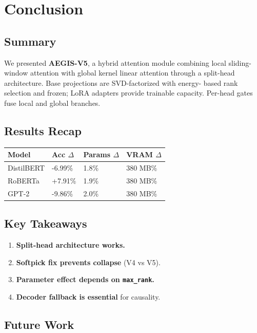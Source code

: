 \section{Conclusion}

\subsection{Summary}

We presented \textbf{AEGIS-V5}, a hybrid attention module combining local 
sliding-window attention with global kernel linear attention through a 
split-head architecture. Base projections are SVD-factorized with energy-
based rank selection and frozen; LoRA adapters provide trainable capacity. 
Per-head gates fuse local and global branches.

\subsection{Results Recap}

\begin{table}[H]
\centering
\small
\begin{tabular}{llll}
\toprule
\textbf{Model} & \textbf{Acc $\Delta$} & \textbf{Params $\Delta$} & \textbf{VRAM $\Delta$} \\
\midrule
DistilBERT & -6.99\% & 1.8\% & 380 MB\% \\
RoBERTa & +7.91\% & 1.9\% & 380 MB\% \\
GPT-2 & -9.86\% & 2.0\% & 380 MB\% \\
\bottomrule
\end{tabular}
\end{table}

\subsection{Key Takeaways}

\begin{enumerate}
\item \textbf{Split-head architecture works.}
\item \textbf{Softpick fix prevents collapse} (V4 vs V5).
\item \textbf{Parameter effect depends on \texttt{max\_rank}.}
\item \textbf{Decoder fallback is essential} for causality.

\end{enumerate}
\subsection{Future Work}

